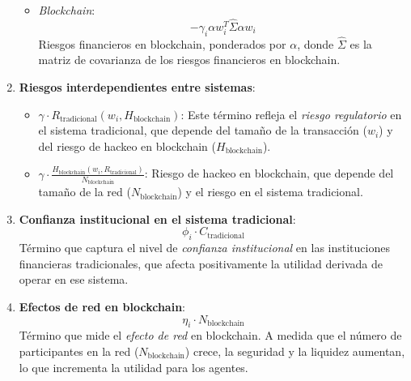 \begin{enumerate}
\begin{itemize}
        \item \textit{Blockchain}:
        \[
        - \gamma_i \alpha w_i^T \hat{\Sigma} \alpha w_i
        \]
        Riesgos financieros en blockchain, ponderados por $\alpha$, donde $\hat{\Sigma}$ es la matriz de covarianza de los riesgos financieros en blockchain.
    \end{itemize}
    
    \item \textbf{Riesgos interdependientes entre sistemas}:
    \begin{itemize}
        \item $\gamma \cdot R_{\text{tradicional}}(w_i, H_{\text{blockchain}})$: Este término refleja el \textit{riesgo regulatorio} en el sistema tradicional, que depende del tamaño de la transacción ($w_i$) y del riesgo de hackeo en blockchain ($H_{\text{blockchain}}$).
        \item $\gamma \cdot \frac{H_{\text{blockchain}}(w_i, R_{\text{tradicional}})}{N_{\text{blockchain}}}$: Riesgo de hackeo en blockchain, que depende del tamaño de la red ($N_{\text{blockchain}}$) y el riesgo en el sistema tradicional.
    \end{itemize}
    
    \item \textbf{Confianza institucional en el sistema tradicional}:
    \[
    \phi_i \cdot C_{\text{tradicional}}
    \]
    Término que captura el nivel de \textit{confianza institucional} en las instituciones financieras tradicionales, que afecta positivamente la utilidad derivada de operar en ese sistema.
    
    \item \textbf{Efectos de red en blockchain}:
    \[
    \eta_i \cdot N_{\text{blockchain}}
    \]
    Término que mide el \textit{efecto de red} en blockchain. A medida que el número de participantes en la red ($N_{\text{blockchain}}$) crece, la seguridad y la liquidez aumentan, lo que incrementa la utilidad para los agentes.
\end{enumerate}
